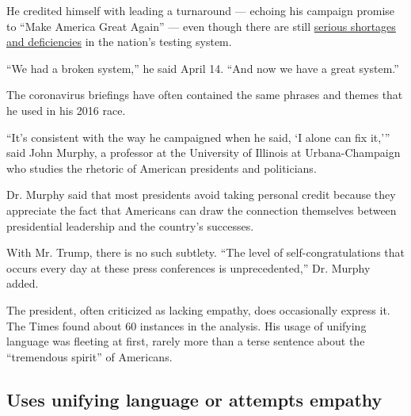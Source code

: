 He credited himself with leading a turnaround --- echoing his campaign
promise to ``Make America Great Again'' --- even though there are still
\href{https://www.nytimes3xbfgragh.onion/2020/04/15/us/coronavirus-testing-trump.html}{serious
shortages and deficiencies} in the nation's testing system.

``We had a broken system,'' he said April 14. ``And now we have a great
system.''

The coronavirus briefings have often contained the same phrases and
themes that he used in his 2016 race.

``It's consistent with the way he campaigned when he said, `I alone can
fix it,''' said John Murphy, a professor at the University of Illinois
at Urbana-Champaign who studies the rhetoric of American presidents and
politicians.

Dr. Murphy said that most presidents avoid taking personal credit
because they appreciate the fact that Americans can draw the connection
themselves between presidential leadership and the country's successes.

With Mr. Trump, there is no such subtlety. ``The level of
self-congratulations that occurs every day at these press conferences is
unprecedented,'' Dr. Murphy added.

The president, often criticized as lacking empathy, does occasionally
express it. The Times found about 60 instances in the analysis. His
usage of unifying language was fleeting at first, rarely more than a
terse sentence about the ``tremendous spirit'' of Americans.

\hypertarget{uses-unifying-language-or-attempts-empathy}{%
\subsection{Uses unifying language or attempts
empathy}\label{uses-unifying-language-or-attempts-empathy}}

